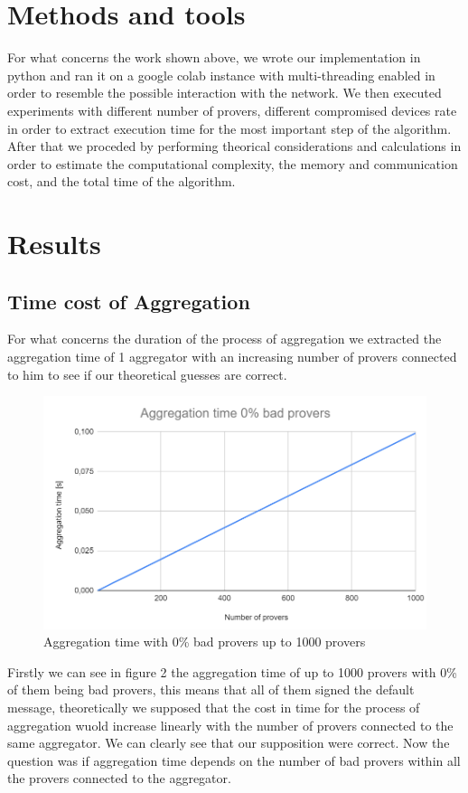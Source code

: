 \documentclass[10pt, a4paper, twocolumn]{article} %
\begin{document}
\section{Methods and tools}

For what concerns the work shown above, we wrote our implementation in python and ran it on a google colab instance with multi-threading enabled in order to resemble the possible interaction with the network.
We then executed experiments with different number of provers, different compromised devices rate in order to extract execution time for the most important step of the algorithm.
After that we proceded by performing theorical considerations and calculations in order to estimate the computational complexity, the memory and communication cost, and the total time of the algorithm.

\section{Results}
\subsection{Time cost of Aggregation}
For what concerns the duration of the process of aggregation we extracted the aggregation time of 1 aggregator with an increasing number of provers connected to him to see if our theoretical guesses are correct.
\begin{figure}
	\includegraphics[width=\linewidth]{images/aggregation_0.png} %
	\caption{Aggregation time with 0\% bad provers up to 1000 provers} %
	\label{bear} %
\end{figure}

Firstly we can see in figure 2 the aggregation time of up to 1000 provers with 0\% of them being bad provers, this means that all of them signed the default message, theoretically we supposed that the cost in time 
for the process of aggregation wuold increase linearly with the number of provers connected to the same aggregator. We can clearly see that our supposition were correct.
Now the question was if aggregation time depends on the number of bad provers within all the provers connected to the aggregator.\\
\end{document}
